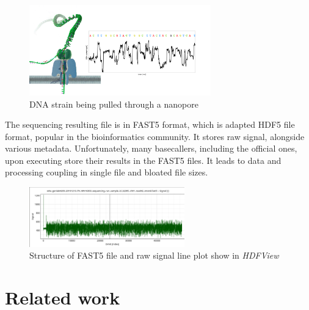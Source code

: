 \documentclass[times, utf8, diplomski, english]{fer}
\begin{document}
\begin{figure}[!ht]
    \begin{center}
        \includegraphics[width=0.7\textwidth]{nanopore}
        
        \caption[DNA strain being pulled through a nanopore]{DNA strain being pulled through a nanopore \protect\footnotemark}
        \label{fg:nanopore}
    \end{center}
\end{figure}

The sequencing resulting file is in FAST5 format, which is adapted HDF5 file format, popular in the bioinformatics community. It stores raw signal, alongside various metadata. Unfortunately, many basecallers, including the official ones, upon executing store their results in the FAST5 files. It leads to data and processing coupling in single file and bloated file sizes. 

\begin{figure}[!ht]
    \begin{center}
        \includegraphics[width=0.6\textwidth]{fast5_sample}
        \caption[Structure of FAST5 file and raw signal plot show in \textit{HDFView}]{Structure of FAST5 file and raw signal line plot show in \textit{HDFView} \protect\footnotemark}
        \label{fg:fast5}
    \end{center}
\end{figure}
  
\section{Related work}
\end{document}
